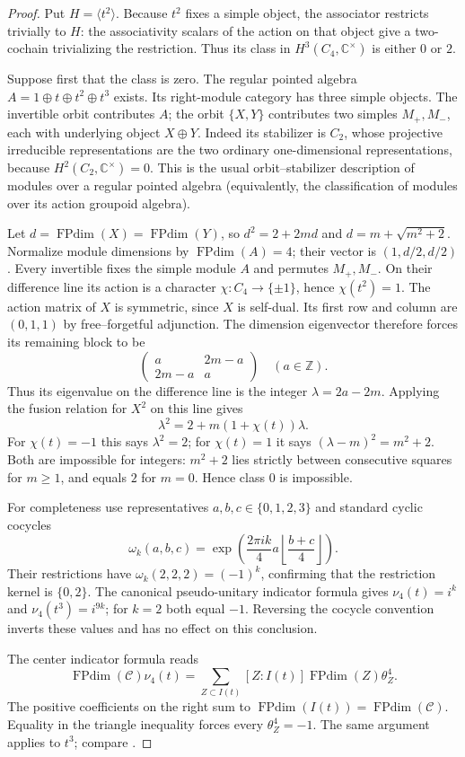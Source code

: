 \begin{proof}
Put $H=\langle t^2\rangle$. Because $t^2$ fixes a simple object,
the associator restricts trivially to $H$: the associativity scalars
of the action on that object give a two-cochain trivializing the
restriction. Thus its class in $H^3(C_4,\mathbb C^\times)$ is either
$0$ or $2$.

Suppose first that the class is zero. The regular pointed algebra
$A=1\oplus t\oplus t^2\oplus t^3$ exists. Its right-module category
has three simple objects. The invertible orbit contributes $A$;
the orbit $\{X,Y\}$ contributes two simples $M_+,M_-$, each with
underlying object $X\oplus Y$. Indeed its stabilizer is $C_2$,
whose projective irreducible representations are the two ordinary
one-dimensional representations, because $H^2(C_2,\mathbb C^\times)=0$.
This is the usual orbit--stabilizer description of modules over a
regular pointed algebra (equivalently, the classification of modules
over its action groupoid algebra).

Let $d=\operatorname{FPdim}(X)=\operatorname{FPdim}(Y)$, so
$d^2=2+2md$ and $d=m+\sqrt{m^2+2}$. Normalize module dimensions
by $\operatorname{FPdim}(A)=4$; their vector is $(1,d/2,d/2)$.
Every invertible fixes the simple module $A$ and permutes $M_+,M_-$.
On their difference line its action is a character
$\chi:C_4\to\{\pm1\}$, hence $\chi(t^2)=1$.
The action matrix of $X$ is symmetric, since $X$ is self-dual.
Its first row and column are $(0,1,1)$ by free--forgetful adjunction.
The dimension eigenvector therefore forces its remaining block to be
\[
 \begin{pmatrix}a&2m-a\\2m-a&a\end{pmatrix}
 \quad (a\in\mathbb Z).
\]
Thus its eigenvalue on the difference line is the integer
$\lambda=2a-2m$. Applying the fusion relation for $X^2$ on this
line gives
\[
 \lambda^2=2+m(1+\chi(t))\lambda.
\]
For $\chi(t)=-1$ this says $\lambda^2=2$; for $\chi(t)=1$
it says $(\lambda-m)^2=m^2+2$. Both are impossible for integers:
$m^2+2$ lies strictly between consecutive squares for $m\geq1$,
and equals $2$ for $m=0$. Hence class $0$ is impossible.

For completeness use representatives $a,b,c\in\{0,1,2,3\}$ and
standard cyclic cocycles
\[
 \omega_k(a,b,c)=\exp\left(\frac{2\pi i k}{4}
          a\left\lfloor\frac{b+c}{4}\right\rfloor\right).
\]
Their restrictions have $\omega_k(2,2,2)=(-1)^k$, confirming
that the restriction kernel is $\{0,2\}$. The canonical
pseudo-unitary indicator formula gives
$\nu_4(t)=i^k$ and $\nu_4(t^3)=i^{9k}$; for $k=2$ both equal
$-1$. Reversing the cocycle convention inverts these values and
has no effect on this conclusion.

The center indicator formula reads
\[
 \operatorname{FPdim}(\mathcal C)\nu_4(t)
   =\sum_{Z\subset I(t)}[Z:I(t)]\operatorname{FPdim}(Z)\theta_Z^4.
\]
The positive coefficients on the right sum to
$\operatorname{FPdim}(I(t))=\operatorname{FPdim}(\mathcal C)$.
Equality in the triangle inequality forces every $\theta_Z^4=-1$.
The same argument applies to $t^3$; compare
\cite[Proposition~3.8]{SchTwo}.
\end{proof}

